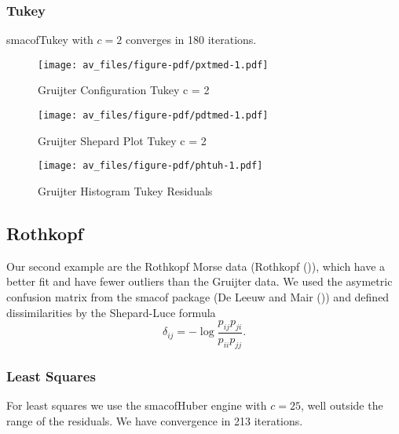 \documentclass[
  12pt,
  letterpaper,
  DIV=11,
  numbers=noendperiod]{scrartcl}
\theoremstyle{plain}
\theoremstyle{plain}
\theoremstyle{plain}
\theoremstyle{definition}
\theoremstyle{remark}
\begin{document}
\subsubsection{Tukey}\label{tukey-1}

smacofTukey with \(c=2\) converges in 180 iterations.

\begin{figure}[H]

{\centering \texttt{[image: av\_files/figure-pdf/pxtmed-1.pdf]}

}

\caption{Gruijter Configuration Tukey c = 2}

\end{figure}%

\begin{figure}[H]

{\centering \texttt{[image: av\_files/figure-pdf/pdtmed-1.pdf]}

}

\caption{Gruijter Shepard Plot Tukey c = 2}

\end{figure}%

\begin{figure}[H]

{\centering \texttt{[image: av\_files/figure-pdf/phtuh-1.pdf]}

}

\caption{Gruijter Histogram Tukey Residuals}

\end{figure}%

\subsection{Rothkopf}\label{rothkopf}

Our second example are the Rothkopf Morse data (Rothkopf
()), which have a better fit and have
fewer outliers than the Gruijter data. We used the asymetric confusion
matrix from the smacof package (De Leeuw and Mair
()) and defined dissimilarities
by the Shepard-Luce formula \[
\delta_{ij}=-\log\frac{p_{ij}p_{ji}}{p_{ii}p_{jj}}.
\]

\subsubsection{Least Squares}\label{least-squares-1}

For least squares we use the smacofHuber engine with \(c=25\), well
outside the range of the residuals. We have convergence in 213
iterations.
\end{document}
